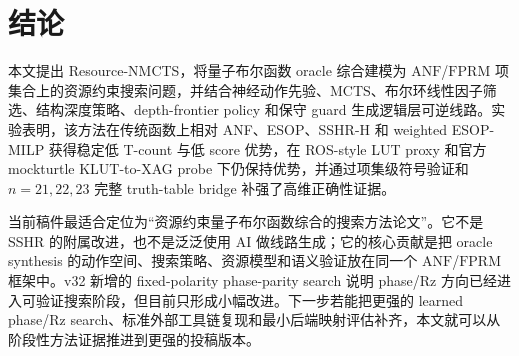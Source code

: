 \documentclass[UTF8,fontset=macnew,11pt]{ctexart}
\newcommand{\method}{Resource-NMCTS}
\newcommand{\anf}{\ensuremath{\mathrm{ANF}}}
\newcommand{\fprm}{\ensuremath{\mathrm{FPRM}}}
\newcommand{\mcts}{\ensuremath{\mathrm{MCTS}}}
\begin{document}
\section{结论}

本文提出 \method{}，将量子布尔函数 oracle 综合建模为 \anf{}/\fprm{} 项集合上的资源约束搜索问题，并结合神经动作先验、\mcts{}、布尔环线性因子筛选、结构深度策略、depth-frontier policy 和保守 guard 生成逻辑层可逆线路。实验表明，该方法在传统函数上相对 ANF、ESOP、SSHR-H 和 weighted ESOP-MILP 获得稳定低 T-count 与低 score 优势，在 ROS-style LUT proxy 和官方 mockturtle KLUT-to-XAG probe 下仍保持优势，并通过项集级符号验证和 $n=21,22,23$ 完整 truth-table bridge 补强了高维正确性证据。

当前稿件最适合定位为“资源约束量子布尔函数综合的搜索方法论文”。它不是 SSHR 的附属改进，也不是泛泛使用 AI 做线路生成；它的核心贡献是把 oracle synthesis 的动作空间、搜索策略、资源模型和语义验证放在同一个 \anf{}/\fprm{} 框架中。v32 新增的 fixed-polarity phase-parity search 说明 phase/Rz 方向已经进入可验证搜索阶段，但目前只形成小幅改进。下一步若能把更强的 learned phase/Rz search、标准外部工具链复现和最小后端映射评估补齐，本文就可以从阶段性方法证据推进到更强的投稿版本。
\end{document}

